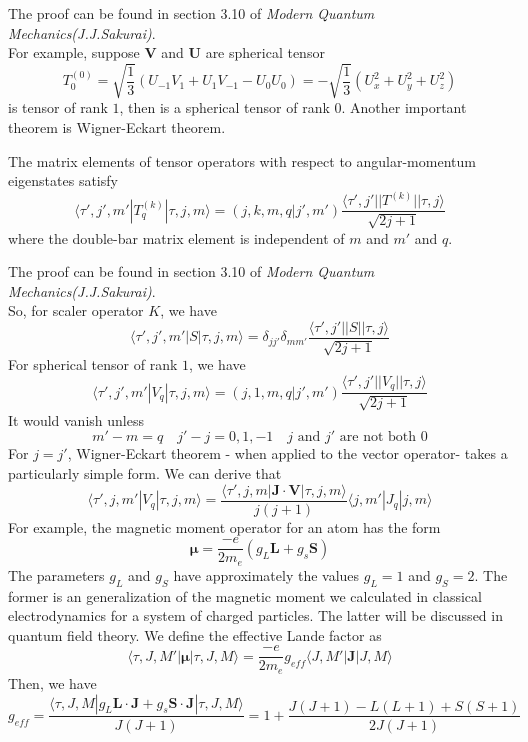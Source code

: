 \noindent
The proof can be found in section 3.10 of \emph{Modern Quantum Mechanics(J.J.Sakurai)}.\\
For example, suppose $\bm{V}$ and $\bm{U}$ are spherical tensor
\[T^{(0)}_{0} = \sqrt{\frac{1}{3}} (U_{-1}V_{1} + U_{1}V_{-1}-U_{0}U_{0}) = - \sqrt{\frac{1}{3}} (U_x^2 + U_y^2 + U_z^2)\]
is tensor of rank $1$, then is a spherical tensor of rank $0$. Another important theorem is Wigner-Eckart theorem.
\begin{newthem}
The matrix elements of tensor operators with respect to angular-momentum eigenstates satisfy
\[\langle \tau',j',m'| T^{(k)}_{q}| \tau,j,m\rangle = (j,k,m,q|j',m') \frac{\langle \tau',j' || T^{(k)} || \tau,j\rangle}{\sqrt{2j+1}}\]
where the double-bar matrix element is independent of $m$ and $m'$ and $q$.
\end{newthem}
\noindent
The proof can be found in section 3.10 of \emph{Modern Quantum Mechanics(J.J.Sakurai)}.\\
So, for scaler operator $K$, we have
\[\langle \tau',j',m'| S| \tau,j,m\rangle = \delta_{jj'}\delta_{mm'} \frac{\langle \tau',j' || S || \tau,j\rangle}{\sqrt{2j+1}}\]
For spherical tensor of rank $1$, we have
\[\langle \tau',j',m'| V_{q} | \tau,j,m\rangle = (j,1,m,q|j',m') \frac{\langle \tau',j' || V_q || \tau,j\rangle}{\sqrt{2j+1}}\]
It would vanish unless
\[m'-m = q \quad j'-j = 0,1,-1 \quad j \mbox{ and } j' \mbox{ are not both  } 0\]
For $j=j'$, Wigner-Eckart theorem - when applied to the vector operator- takes a particularly simple form. We can derive that
\[\langle \tau',j,m' | V_q | \tau, j ,m \rangle = \frac{\langle \tau',j,m | \bm{J}\cdot\bm{V} | \tau, j ,m \rangle}{j(j+1)} \langle j,m' | J_q | j ,m \rangle\]
For example, the magnetic moment operator for an atom has the form
\[\bm{\mu} = \frac{-e}{2m_e } (g_L\bm{L} + g_s \bm{S})\]
The parameters $g_L$ and $g_S$ have approximately the
values $g_L = 1$ and $g_S = 2$. The former is an generalization of the magnetic moment we calculated in classical electrodynamics for a system of charged particles. The latter will be discussed in quantum field theory.
We define the effective Lande factor as
\[\langle \tau,J,M' | \bm{\mu} | \tau,J,M \rangle = \frac{-e}{2m_e } g_{eff} \langle J,M' | \bm{J} | J,M \rangle\]
Then, we have
\[g_{eff} = \frac{\langle \tau,J,M | g_L\bm{L}\cdot\bm{J} + g_s \bm{S}\cdot\bm{J} | \tau,J,M \rangle}{J(J+1)} = 1 + \frac{J(J+1)- L(L+1) + S(S+1)}{2J(J+1)}\]

